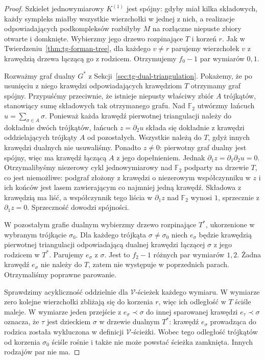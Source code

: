 \begin{proof}
Szkielet jednowymiarowy $K^{(1)}$ jest spójny:
gdyby miał kilka składowych, każdy sympleks
miałby wszystkie wierzchołki w jednej z nich,
a realizacje odpowiadających podkompleksów
rozbiłyby $M$ na rozłączne niepuste zbiory
otwarte i domknięte. Wybierzmy jego drzewo
rozpinające $T$ i korzeń $r$.
Jak w Twierdzeniu~\ref{thm:tg-forman-tree}, dla
każdego $v\ne r$ parujemy wierzchołek $v$
z krawędzią drzewa łączącą go z rodzicem.
Otrzymujemy $f_0-1$ par wymiarów $0,1$.

Rozważmy graf dualny $G^*$ z
Sekcji~\ref{sec:tg-dual-triangulation}.
Pokażemy, że po usunięciu z niego krawędzi
odpowiadających krawędziom $T$ otrzymamy
graf spójny. Przypuśćmy przeciwnie, że
istnieje niepusty właściwy zbiór $A$
trójkątów, stanowiący sumę składowych
tak otrzymanego grafu. Nad $\mathbb F_2$
utwórzmy łańcuch $u=\sum_{\sigma\in A}\sigma$.
Ponieważ każda krawędź pierwotnej triangulacji
należy do dokładnie dwóch trójkątów,
łańcuch $z=\partial_2u$ składa się dokładnie
z krawędzi oddzielających trójkąty $A$
od pozostałych. Wszystkie należą do $T$,
gdyż innych krawędzi dualnych nie usuwaliśmy.
Ponadto $z\ne0$: pierwotny graf dualny
jest spójny, więc ma krawędź łączącą
$A$ z jego dopełnieniem.
Jednak $\partial_1z=\partial_1\partial_2u=0$.
Otrzymalibyśmy niezerowy cykl jednowymiarowy
nad $\mathbb F_2$ podparty na drzewie $T$,
co jest niemożliwe: podgraf złożony z krawędzi
o niezerowym współczynniku w $z$ i ich końców
jest lasem zawierającym co najmniej jedną krawędź.
Składowa z krawędzią ma liść, a współczynnik tego
liścia w $\partial_1z$ nad $\mathbb F_2$ wynosi $1$,
sprzecznie z $\partial_1z=0$.
Sprzeczność dowodzi spójności.

W pozostałym grafie dualnym wybierzmy
drzewo rozpinające $T^*$, ukorzenione
w wybranym trójkącie $\sigma_0$.
Dla każdego trójkąta $\sigma\ne\sigma_0$
niech $e_\sigma$ będzie krawędzią
pierwotnej triangulacji odpowiadającą
dualnej krawędzi łączącej $\sigma$
z jego rodzicem w $T^*$. Parujemy
$e_\sigma$ z $\sigma$. Jest to $f_2-1$
różnych par wymiarów $1,2$.
Żadna krawędź $e_\sigma$ nie należy do
$T$, zatem nie występuje w poprzednich
parach. Otrzymaliśmy poprawne parowanie.

Sprawdzimy acykliczność oddzielnie dla
$\mathcal V$-ścieżek każdego wymiaru.
W wymiarze zero kolejne wierzchołki
zbliżają się do korzenia $r$, więc
ich odległość w $T$ ściśle maleje.
W wymiarze jeden przejście z
$e_\sigma\prec\sigma$ do innej
sparowanej krawędzi $e_\tau\prec\sigma$
oznacza, że $\tau$ jest dzieckiem $\sigma$
w drzewie dualnym $T^*$: krawędź
$e_\sigma$ prowadząca do rodzica
została wykluczona w definicji
$\mathcal V$-ścieżki. Wobec tego
odległość trójkątów od korzenia
$\sigma_0$ ściśle rośnie i także
nie może powstać ścieżka zamknięta.
Innych rodzajów par nie ma.


\end{proof}
